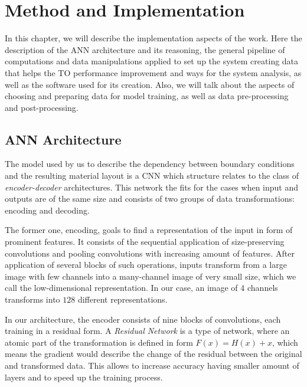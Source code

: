
\chapter{Method and Implementation}

In this chapter, we will describe the implementation aspects of the work.
Here the description of the ANN architecture and its reasoning, the general pipeline of computations and data manipulations applied to set up the system creating data that helps the TO performance improvement and ways for the system analysis, as well as the software used for its creation.
Also, we will talk about the aspects of choosing and preparing data for model training, as well as data pre-processing and post-processing.
\medskip



\section{ANN Architecture}
\label{sec:arch}

The model used by us to describe the dependency between boundary conditions and the resulting material layout is a CNN which structure relates to the class of \emph{encoder-decoder} architectures.
This network the fits for the cases when input and outputs are of the same size and consists of two groups of data transformations: encoding and decoding.
\medskip

The former one, encoding, goals to find a representation of the input in form of prominent features.
It consists of the sequential application of size-preserving convolutions and pooling convolutions with increasing amount of features. 
After application of several blocks of such operations, inputs transform from a large image with few channels into a many-channel image of very small size, which we call the low-dimensional representation. 
In our case, an image of $4$ channels transforms into $128$ different representations. 
\medskip

In our architecture, the encoder consists of nine blocks of convolutions, 
each training in a residual form.
A \textit{Residual Network} is a type of network, where an atomic part of the transformation is defined in form $F(x) = H(x) + x $, which means the gradient would describe the change of the residual between the original and transformed data\cite{bibl:resnet}.
This allows to increase accuracy having smaller amount of layers and to speed up the training process.
\medskip

